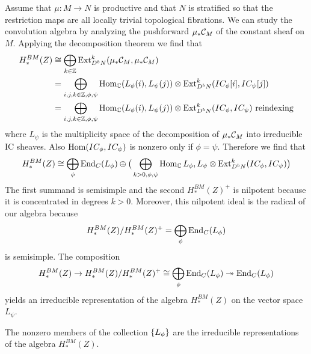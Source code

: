 \documentclass[12pt]{article}
\begin{document}
Assume that $\mu:M\to N$ is productive and that $N$ is stratified
 so that the restriction maps are all locally trivial topological fibrations.
 We can study the convolution algebra by analyzing the pushforward
 $\mu_*{\mathcal{C}}_M$ of the constant sheaf on $M$. Applying the 
 decomposition theorem we find that \begin{align*}
    H^{BM}_*(Z) &\cong \bigoplus_{k\in \mathbb{Z}} \operatorname{Ext}^k_{D^bN}(\mu_*{\mathcal{C}}_M,\mu_*{\mathcal{C}}_M) \\
    &= \bigoplus_{i,j,k\in\mathbb{Z},\phi,\psi} \operatorname{Hom}_{\mathbb{C}}(L_\phi(i),L_\psi(j))\otimes \operatorname{Ext}^k_{D^bN}(IC_\phi[i],IC_\psi[j]) \\
    &= \bigoplus_{i,j,k\in\mathbb{Z},\phi,\psi} \operatorname{Hom}_{\mathbb{C}}(L_\phi(i),L_\psi(j))\otimes \operatorname{Ext}^k_{D^bN}(IC_\phi,IC_\psi) \text{ reindexing}
 \end{align*}
where $L_\psi$ is the multiplicity space of the decomposition of $\mu_*{\mathcal{C}}_M$ into irreducible 
IC sheaves.
Also $\operatorname{Hom}(IC_\phi,IC_\psi)$ is nonzero only if $\phi = \psi$. Therefore 
we find that \begin{align*}
    H^{BM}_*(Z) \cong \bigoplus_\phi \operatorname{End}_C(L_\phi) \oplus \big(\bigoplus_{k>0,\phi,\psi} \operatorname{Hom}_{\mathbb{C}}{L_\phi,L_\psi}\otimes
    \operatorname{Ext}^k_{D^bN}(IC_\phi,IC_\psi)\big)
\end{align*} The first summand is semisimple and the second $H^{BM}_*(Z)^+$ is nilpotent because
it is concentrated in degrees $k>0$. Moreover, this nilpotent ideal is the radical 
of our algebra because 
\begin{align*}
    H^{BM}_*(Z) / H^{BM}_*(Z)^+ = \bigoplus_\phi \operatorname{End}_C(L_\phi)
\end{align*} is semisimple. The composition \begin{align*}
    H^{BM}_*(Z) \to H^{BM}_*(Z) / H^{BM}_*(Z)^+ \cong \bigoplus_\phi \operatorname{End}_C(L_\phi) \twoheadrightarrow \operatorname{End}_C(L_\phi)
\end{align*} yields an irreducible representation of the algebra $H^{BM}_*(Z)$ on the vector space $L_\psi$.
\begin{theorem}
    The nonzero members of the collection $\{L_\phi\}$ are the 
    irreducible representations of the algebra $H^{BM}_*(Z)$.
\end{theorem}
\end{document}
